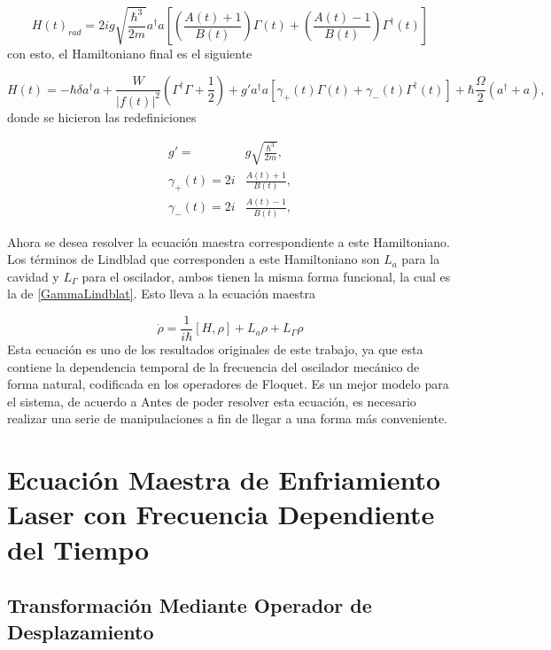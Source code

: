 \documentclass[a4paper,10pt]{report}
\begin{document}
\begin{equation}
H(t)_{rad} = 2ig\sqrt{\frac{\hbar^3}{2m}}  a^\dagger a[(\frac{A(t) +1}{B(t)})\Gamma (t) +(\frac{A(t) -1}{B(t)})\Gamma^\dagger (t)]
\end{equation} con esto, el Hamiltoniano final es el siguiente

\begin{equation}\label{LaserCoolingHamiltonian}
H(t) = -\hbar \delta a^\dagger a + \frac{W}{|f(t)|^2}(\Gamma^\dagger \Gamma + \frac{1}{2}) +  g'a^\dagger a[\gamma_+(t)\Gamma (t) +\gamma_-(t)\Gamma^\dagger (t)] + \hbar\frac{\Omega}{2}(a^\dagger + a),
\end{equation} donde se hicieron las redefiniciones

\begin{align*}
g'=&g\sqrt{\frac{\hbar^3}{2m}},\\
\gamma_+(t)=2i&\frac{A(t) +1}{B(t)},\\
\gamma_-(t)=2i&\frac{A(t) -1}{B(t)},
\end{align*} 

Ahora se desea resolver la ecuación maestra correspondiente a este Hamiltoniano. Los términos de Lindblad que corresponden a este Hamiltoniano son $L_a$ para la cavidad y $L_\Gamma$ para el oscilador, ambos tienen la misma forma funcional, la cual es la de \eqref{GammaLindblat}. Esto lleva a la ecuación maestra

\begin{equation}\label{LCMasterEquation}
\dot{\rho} = \frac{1}{i\hbar}[H,\rho] + L_a\rho + L_\Gamma \rho
\end{equation}Esta ecuación es uno de los resultados originales de este trabajo, ya que esta contiene la dependencia temporal de la frecuencia del oscilador mecánico de forma natural, codificada en los operadores de Floquet. Es un mejor modelo para el sistema, de acuerdo a \cite{HanngiFM} Antes de poder resolver esta ecuación, es necesario realizar una serie de manipulaciones a fin de llegar a una forma más conveniente.

\chapter{Ecuación Maestra de Enfriamiento Laser con Frecuencia Dependiente del Tiempo}

\section{Transformación Mediante Operador de Desplazamiento}
\end{document}
